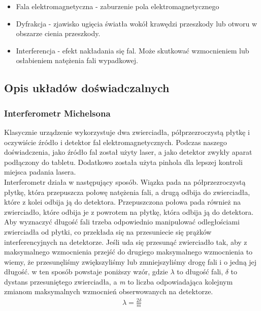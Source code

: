 \documentclass{article}
\begin{document}
\begin{itemize}
\item Fala elektromagnetyczna - zaburzenie pola elektromagnetycznego
\item Dyfrakcja - zjawisko ugięcia światła wokół krawędzi przeszkody lub otworu w obszarze cienia przeszkody.
\item Interferencja - efekt nakładania się fal. Może skutkować wzmocnieniem lub osłabieniem natężenia fali wypadkowej.
\end{itemize}

\subsection{Opis układów doświadczalnych}

\subsubsection{Interferometr Michelsona}
Klasycznie urządzenie wykorzystuje dwa zwierciadła, półprzezroczystą płytkę i oczywiście źródło i detektor fal elektromagnetycznych. Podczas naszego doświadczenia, jako źródło fal został użyty laser, a jako detektor zwykły aparat podłączony do tabletu. Dodatkowo została użyta pinhola dla lepszej kontroli miejsca padania lasera. \\
Interferometr działa w następujący sposób. Wiązka pada na półprzezroczystą płytkę, która przepuszcza połowę natężenia fali, a drugą odbija do zwierciadła, które z kolei odbija ją do detektora. Przepuszczona połowa pada również na zwierciadło, które odbija je z powrotem na płytkę, która odbija ją do detektora. \\
Aby wyznaczyć długość fali trzeba odpowiednio manipulować odległościami zwierciadła od płytki, co przekłada się na przesuniecie się prążków interferencyjnych na detektorze. Jeśli uda się przesunąć zwierciadło tak, aby z maksymalnego wzmocnienia przejść do drugiego maksymalnego wzmocnienia to wiemy, że przesunęliśmy zwiększyliśmy lub zmniejszyliśmy drogę fali i o jedną jej długość. w ten sposób powstaje poniższy wzór, gdzie \textit{$\lambda$} to długość fali, \textit{$\delta$} to dystans przesuniętego zwierciadła, a \textit{m} to liczba odpowiadająca kolejnym zmianom maksymalnych wzmocnień obserwowanych na detektorze.
\begin{gather*}
     \lambda = \frac{2\delta}{m}
\end{gather*}
\end{document}
